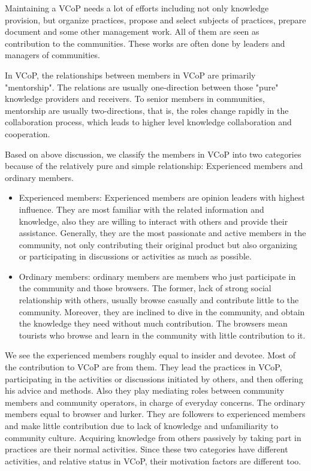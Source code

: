\documentclass[doublespacing]{elsarticle}
\begin{document}
Maintaining a VCoP needs a lot of efforts including not only  knowledge
provision, but organize practices, propose and select subjects of
practices, prepare document and some other management work. All of
them are seen as contribution to the communities. These
works are often  done by leaders and managers of communities.

  

In VCoP,  the relationships between members
in VCoP are primarily "mentorship". The relations are usually one-direction between those "pure" knowledge providers and receivers. To
senior members in communities, mentorship are usually two-directions,
that is,  the roles change rapidly in the collaboration process,
which leads to higher level knowledge collaboration and cooperation.
   
Based on above discussion,
we classify the members in VCoP into two categories because of the
relatively pure and simple relationship:   Experienced members and  ordinary members.

\begin{itemize}
\item   Experienced members: Experienced members are opinion leaders with highest influence. They are most familiar with the related information and knowledge, also they are willing to interact with others and provide their assistance. Generally, they are the most passionate and active members in the community, not only contributing their original product but also organizing or participating in discussions or activities as much as possible. 

\item  Ordinary members: ordinary members are members who just
participate in the community and those browsers. The former, lack of
strong social relationship with others, usually browse casually and
contribute little to the community. Moreover, they are inclined to
dive in the community, and obtain the knowledge they need without much
contribution. The browsers mean tourists who browse and learn in the
community with little contribution to it. 
\end{itemize}

We see the  experienced members roughly equal to insider and
devotee. Most of the contribution to VCoP are from them. They
lead the practices in VCoP, participating in the activities or
discussions initiated by others, and then offering his advice and
methods. Also they play mediating roles between community members and community operators, in charge of everyday concerns.
 The ordinary members equal to browser and lurker. They are followers
 to experienced members and make little contribution due to lack of
 knowledge and unfamiliarity to community culture. Acquiring knowledge
 from others passively by taking part in practices are their normal
 activities. Since these two categories have different activities, and
 relative status in VCoP, their motivation factors are different too.
\end{document}
